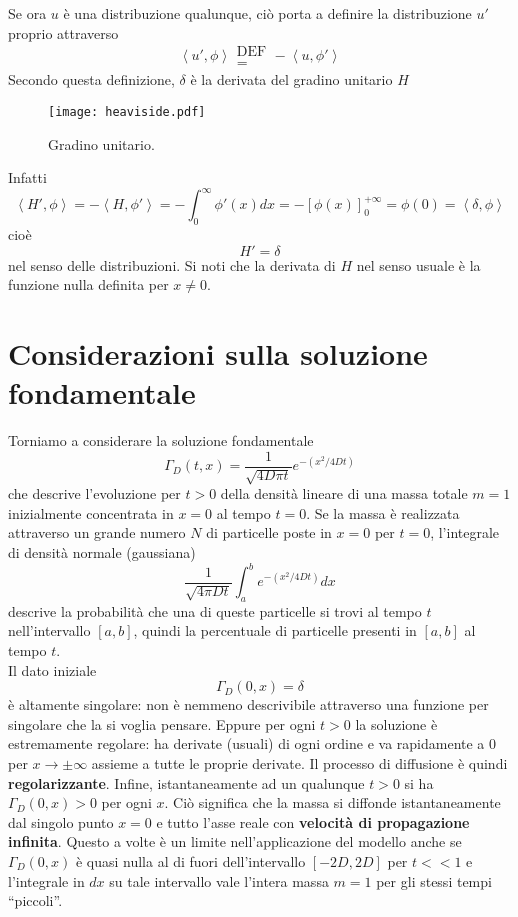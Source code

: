 Se ora $u$ \`e una distribuzione qualunque, ci\`o porta a definire la
distribuzione $u'$ proprio attraverso
\[
	\left< u', \phi \right>\substack{\text{DEF} \\ =} - \left< u, \phi '
\right>
\]
Secondo questa definizione, $\delta$ \`e la derivata del gradino unitario $H$
\begin{figure}[H]
	\centering
	\texttt{[image: heaviside.pdf]}
	\caption{Gradino unitario.}
	\label{heaviside}
\end{figure}
\noindent
Infatti
\[
	\left< H', \phi \right>= - \left< H, \phi ' \right>
	=- \int_0^{\infty} \phi'(x) dx
	=- \left[ \phi (x) \right]^{+ \infty}_{0}
	= \phi(0)= \left< \delta, \phi \right>
\]
cio\`e
\[
	H'=\delta
\]
nel senso delle distribuzioni.
Si noti che la derivata di $H$ nel senso usuale \`e la funzione nulla definita
per $x \neq 0$.
\section{Considerazioni sulla soluzione fondamentale}
Torniamo a considerare la soluzione fondamentale
\[
	\Gamma_D(t,x)= \frac{1}{\sqrt{4D\pi t}}
	e^{-\left( x^2/4Dt \right)}
\]
che descrive l'evoluzione per $t>0$ della densit\`a lineare di una massa totale
$m=1$ inizialmente concentrata in $x=0$ al tempo $t=0$.
Se la massa \`e realizzata attraverso un grande numero $N$ di particelle poste
in $x=0$ per $t=0$, l'integrale di densit\`a normale (gaussiana)
\[
	\frac{1}{\sqrt{4 \pi D t}}\int_a^b
	e^{-\left( x^2/4Dt \right)} dx
\]
descrive la probabilit\`a che una di queste particelle si trovi al tempo $t$
nell'intervallo $[a,b]$, quindi la percentuale di particelle presenti in $[a,b]$
al tempo $t$.\\
Il dato iniziale
\[
	\Gamma_D(0,x)= \delta
\]
\`e altamente singolare: non \`e nemmeno descrivibile attraverso una funzione
per singolare che la si voglia pensare.
Eppure per ogni $t>0$ la soluzione \`e estremamente regolare: ha derivate
(usuali)
di ogni ordine e va rapidamente a $0$ per $x \to \pm \infty$ assieme a tutte
le proprie derivate.
Il processo di diffusione \`e quindi {\bf regolarizzante}.
Infine, istantaneamente ad un qualunque $t>0$ si ha $\Gamma_D(0,x)>0$ per ogni
$x$. Ci\`o significa che la massa si diffonde istantaneamente dal singolo punto
$x=0$ e tutto l'asse reale con {\bf velocit\`a di propagazione infinita}.
Questo a volte \`e un limite nell'applicazione del modello anche se
$\Gamma_D(0,x)$
\`e quasi nulla al di fuori dell'intervallo $[-2D, 2D]$ per $t<<1$ e
l'integrale in $dx$ su tale intervallo vale l'intera massa $m=1$ per gli
stessi tempi ``piccoli''.
